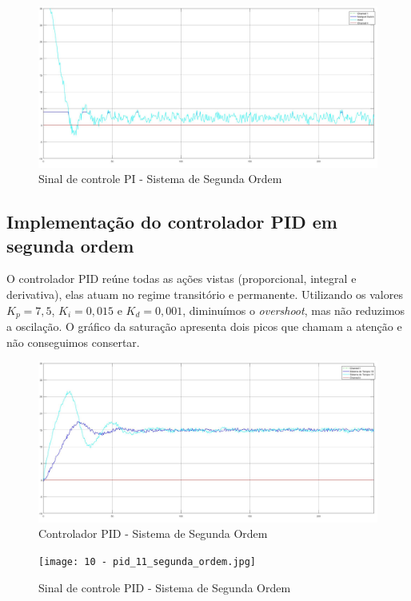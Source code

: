 \documentclass[
	12pt,				%
	openany,			%
	oneside,			%
	a4paper,			%
	english,			%
	french,				%
	spanish,			%
	brazil,				%
	]{abntex2}
\begin{document}
{\begin{figure}[h]
	\centering
	\includegraphics[scale=0.25]{9 - pi_11_segunda_ordem.jpg}
	\caption{Sinal de controle PI - Sistema de Segunda Ordem}
\end{figure}
\clearpage
\subsection{Implementação do controlador PID em segunda ordem}

O controlador PID reúne todas as ações vistas (proporcional, integral e derivativa), elas atuam no regime transitório e permanente. Utilizando os valores $K_p=7,5$, $K_i=0,015$ e $K_d=0,001$, diminuímos o \textit{overshoot}, mas não reduzimos a oscilação. O gráfico da saturação apresenta dois picos que chamam a atenção e não conseguimos consertar.

\begin{figure}[h]
	\centering
	\includegraphics[scale=0.25]{10 - pid_1_segunda_ordem.jpg}
	\caption{Controlador PID - Sistema de Segunda Ordem}
\end{figure}

\begin{figure}[h]
	\centering
	\texttt{[image: 10 - pid\_11\_segunda\_ordem.jpg]}
	\caption{Sinal de controle PID - Sistema de Segunda Ordem}
\end{figure}

}
\end{document}

